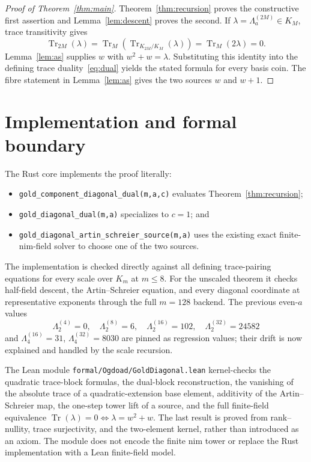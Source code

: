 \documentclass[11pt]{article}
\theoremstyle{remark}
\newcommand{\Tr}{\operatorname{Tr}}
\newcommand{\Lam}{\Lambda}
\begin{document}
\begin{proof}[Proof of Theorem~\ref{thm:main}]
Theorem~\ref{thm:recursion} proves the constructive first assertion and
Lemma~\ref{lem:descent} proves the second.  If
$\lambda=\Lam^{(2M)}_a\in K_M$, trace transitivity gives
\[
 \Tr_{2M}(\lambda)
 =\Tr_M\!\left(\Tr_{K_{2M}/K_M}(\lambda)\right)
 =\Tr_M(2\lambda)=0.
\]
Lemma~\ref{lem:as} supplies $w$ with $w^2+w=\lambda$.  Substituting this
identity into the defining trace duality~\eqref{eq:dual} yields the stated
formula for every basis coin.  The fibre statement in Lemma~\ref{lem:as}
gives the two sources $w$ and $w+1$.
\end{proof}

\section{Implementation and formal boundary}

The Rust core implements the proof literally:
\begin{itemize}
\item \texttt{gold\_component\_diagonal\_dual(m,a,c)} evaluates
Theorem~\ref{thm:recursion};
\item \texttt{gold\_diagonal\_dual(m,a)} specializes to $c=1$; and
\item \texttt{gold\_diagonal\_artin\_schreier\_source(m,a)} uses the existing
exact finite-nim-field solver to choose one of the two sources.
\end{itemize}
The implementation is checked directly against all defining trace-pairing
equations for every scale over $K_m$ at $m\le8$.  For the unscaled theorem it
checks half-field descent, the Artin--Schreier equation, and every diagonal
coordinate at representative exponents through the full $m=128$ backend.  The
previous even-$a$ values
\[
 \Lam^{(4)}_2=0,
 \quad\Lam^{(8)}_2=6,
 \quad\Lam^{(16)}_2=102,
 \quad\Lam^{(32)}_2=24582
\]
and $\Lam^{(16)}_4=31$, $\Lam^{(32)}_4=8030$ are pinned as regression values;
their drift is now explained and handled by the scale recursion.

The Lean module \texttt{formal/Ogdoad/GoldDiagonal.lean} kernel-checks the
quadratic trace-block formulas, the dual-block reconstruction, the vanishing
of the absolute trace of a quadratic-extension base element, additivity of the
Artin--Schreier map, the one-step tower lift of a source, and the full
finite-field equivalence
$\Tr(\lambda)=0\Longleftrightarrow\lambda=w^2+w$. The last result is proved
from rank--nullity, trace surjectivity, and the two-element kernel, rather than
introduced as an axiom. The module does not encode the finite nim tower or
replace the Rust implementation with a Lean finite-field model.
\end{document}
